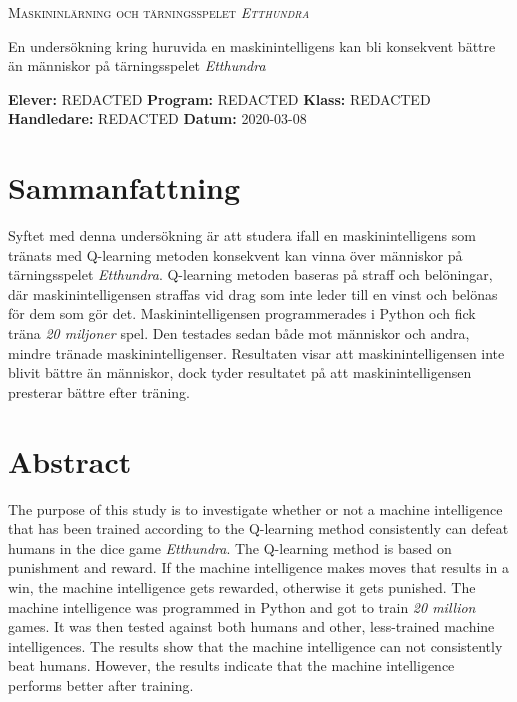 \documentclass[12pt,a4paper]{article}
\begin{document}
  \begin{titlepage}
    \begin{center} 
      \begin{huge}
        \textsc{Maskininlärning och tärningsspelet \emph{Etthundra}} \\ 
        \vspace{0.75cm} 
      \end{huge} 
      \large{En undersökning kring huruvida en maskinintelligens kan bli konsekvent bättre än människor på tärningsspelet \emph{Etthundra}} 
    \end{center}

    \vspace{\fill} 
    \begin{flushleft} 
      \textbf{Elever:} REDACTED
      \textbf{Program:} REDACTED
      \textbf{Klass:} REDACTED
      \textbf{Handledare:} REDACTED
      \textbf{Datum:} 2020-03-08
    \end{flushleft}
  \end{titlepage}
  

  \section*{Sammanfattning}\label{sec:samanfattning}
    Syftet med denna undersökning är att studera ifall en maskinintelligens som tränats med Q-learning metoden konsekvent kan vinna över människor på tärningsspelet \emph{Etthundra}. Q-learning metoden baseras på straff och belöningar, där maskinintelligensen straffas vid drag som inte leder till en vinst och belönas för dem som gör det. Maskinintelligensen programmerades i Python och fick träna \emph{20 miljoner} spel. Den testades sedan både mot människor och andra, mindre tränade maskinintelligenser. Resultaten visar att maskinintelligensen inte blivit bättre än människor, dock tyder resultatet på att maskinintelligensen presterar bättre efter träning.

  \section*{Abstract}\label{sec:abstract}
    The purpose of this study is to investigate whether or not a machine intelligence that has been trained according to the Q-learning method consistently can defeat humans in the dice game \emph{Etthundra}. The Q-learning method is based on punishment and reward. If the machine intelligence makes moves that results in a win, the machine intelligence gets rewarded, otherwise it gets punished. The machine intelligence was programmed in Python and got to train \emph{20 million} games. It was then tested against both humans and other, less-trained machine intelligences. The results show that the machine intelligence can not consistently beat humans. However, the results indicate that the machine intelligence performs better after training.
\end{document}
